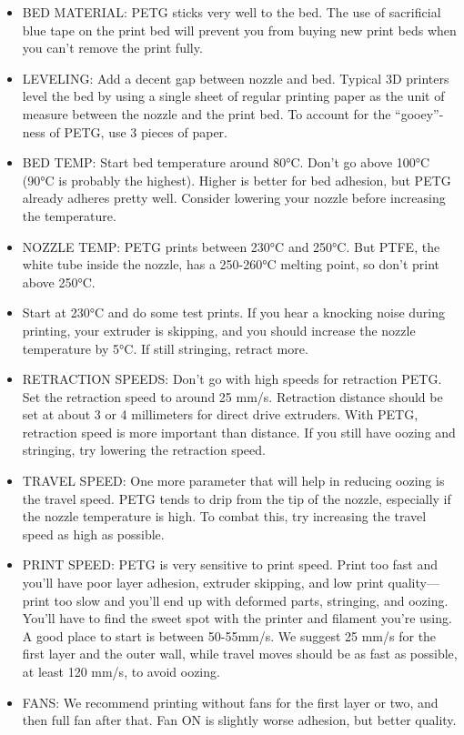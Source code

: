 \begin{itemize}
    \item BED MATERIAL: PETG sticks very well to the bed. The use of sacrificial blue tape on the print bed will prevent you from buying new print beds when you can’t remove the print fully. \item LEVELING: Add a decent gap between nozzle and bed. Typical 3D printers level the bed by using a single sheet of regular printing paper as the unit of measure between the nozzle and the print bed. To account for the “gooey”-ness of PETG, use 3 pieces of paper.
    \item BED TEMP: Start bed temperature around 80°C. Don't go above 100°C (90°C is probably the highest). Higher is better for bed adhesion, but PETG already adheres pretty well. Consider lowering your nozzle before increasing the temperature. 
    \item NOZZLE TEMP: PETG prints between 230°C and 250°C. But PTFE, the white tube inside the nozzle, has a 250-260°C melting point, so don't print above 250°C.
    \item Start at 230°C and do some test prints. If you hear a knocking noise during printing, your extruder is skipping, and you should increase the nozzle temperature by 5°C. If still stringing, retract more.
    \item RETRACTION SPEEDS: Don’t go with high speeds for retraction PETG. Set the retraction speed to around 25 mm/s. Retraction distance should be set at about 3 or 4 millimeters for direct drive extruders. With PETG, retraction speed is more important than distance. If you still have oozing and stringing, try lowering the retraction speed.
    \item TRAVEL SPEED: One more parameter that will help in reducing oozing is the travel speed. PETG tends to drip from the tip of the nozzle, especially if the nozzle temperature is high. To combat this, try increasing the travel speed as high as possible.
    \item PRINT SPEED: PETG is very sensitive to print speed. Print too fast and you’ll have poor layer adhesion, extruder skipping, and low print quality—print too slow and you’ll end up with deformed parts, stringing, and oozing. You’ll have to find the sweet spot with the printer and filament you’re using. A good place to start is between 50-55mm/s. We suggest 25 mm/s for the first layer and the outer wall, while travel moves should be as fast as possible, at least 120 mm/s, to avoid oozing.
    \item FANS: We recommend printing without fans for the first layer or two, and then full fan after that. Fan ON is slightly worse adhesion, but better quality.
\end{itemize}



